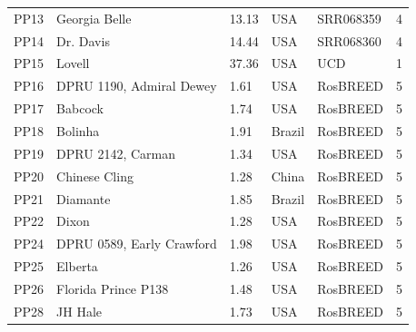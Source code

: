 \documentclass[12pt]{article}
\begin{document}
\begin{center}
\begin{longtable}{lllllc}
	PP13 &Georgia Belle &13.13 &USA &SRR068359 &4\\
	PP14 &Dr. Davis &14.44 &USA &SRR068360 &4\\
	PP15 &Lovell &37.36 &USA &UCD &1\\
	PP16 &DPRU 1190, Admiral Dewey &1.61 &USA &RosBREED &5\\
	PP17 &Babcock &1.74 &USA &RosBREED &5\\
	PP18 &Bolinha &1.91 &Brazil &RosBREED &5\\
	PP19 &DPRU 2142, Carman &1.34 &USA &RosBREED &5\\
	PP20 &Chinese Cling &1.28 &China &RosBREED &5\\
	PP21 &Diamante &1.85 &Brazil &RosBREED &5\\
	PP22 &Dixon &1.28 &USA &RosBREED &5\\
	PP24 &DPRU 0589, Early Crawford &1.98 &USA &RosBREED &5\\
	PP25 &Elberta &1.26 &USA &RosBREED &5\\
	PP26 &Florida Prince P138 &1.48 &USA &RosBREED &5\\
	PP28 &JH Hale &1.73 &USA &RosBREED &5\\

\end{longtable}
\end{center}
\end{document}
